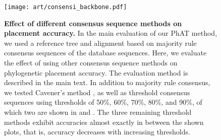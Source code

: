 \begin{figure}[hpbt]
    \centering
    \texttt{[image: art/consensi\_backbone.pdf]}
    \begin{subfigure}{0pt}
        \label{fig:consensi_backbone:sub:majorities}
    \end{subfigure}
    \begin{subfigure}{0pt}
        \label{fig:consensi_backbone:sub:cavener}
    \end{subfigure}
    \begin{subfigure}{0pt}
        \label{fig:consensi_backbone:sub:50_threshold}
    \end{subfigure}
    \begin{subfigure}{0pt}
        \label{fig:consensi_backbone:sub:90_threshold}
    \end{subfigure}
    \caption[Effect of different consensus sequence methods on placement accuracy]{
        \textbf{Effect of different consensus sequence methods on placement accuracy.}
        In the main evaluation of our \ac{PhAT} method,
        we used a reference tree and alignment based on majority rule consensus sequences \citep{May1952,Day1992a}
        of the  database sequences.
        Here, we evaluate the effect of using other consensus sequence methods
        on phylogenetic placement accuracy.
        The evaluation method is described in the main text.
        In addition to  majority rule consensus, we tested
         Cavener's method \citep{Cavener1987,Cavener1991a},
        as well as threshold consensus sequences \citep{Day1992a,Day1992}
        using thresholds of 50\%, 60\%, 70\%, 80\%, and 90\%, of which two are shown in
         and .
        The three remaining threshold methods exhibit accuracies almost exactly in between the shown plots,
        that is, accuracy decreases with increasing thresholds.
}
\end{figure}
